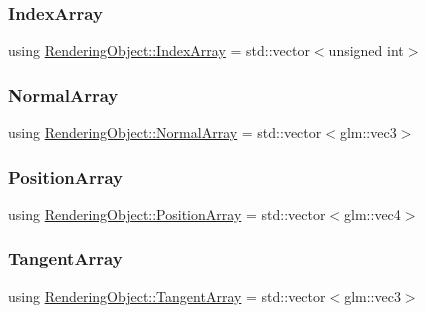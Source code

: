 \hypertarget{class_rendering_object_a9931c88bca3384065c6691dfe1e60af1}{}\label{class_rendering_object_a9931c88bca3384065c6691dfe1e60af1}
\subsubsection{\texorpdfstring{Index\+Array}{IndexArray}}
{\footnotesize\ttfamily using \hyperlink{class_rendering_object_a9931c88bca3384065c6691dfe1e60af1}{Rendering\+Object\+::\+Index\+Array} =  std\+::vector$<$unsigned int$>$}

\hypertarget{class_rendering_object_a327c4d892de8d6138fb59afa6d078257}{}\label{class_rendering_object_a327c4d892de8d6138fb59afa6d078257}
\subsubsection{\texorpdfstring{Normal\+Array}{NormalArray}}
{\footnotesize\ttfamily using \hyperlink{class_rendering_object_a327c4d892de8d6138fb59afa6d078257}{Rendering\+Object\+::\+Normal\+Array} =  std\+::vector$<$glm\+::vec3$>$}

\hypertarget{class_rendering_object_a1223b9cf03f2029b9c43d71042c2a18e}{}\label{class_rendering_object_a1223b9cf03f2029b9c43d71042c2a18e}
\subsubsection{\texorpdfstring{Position\+Array}{PositionArray}}
{\footnotesize\ttfamily using \hyperlink{class_rendering_object_a1223b9cf03f2029b9c43d71042c2a18e}{Rendering\+Object\+::\+Position\+Array} =  std\+::vector$<$glm\+::vec4$>$}

\hypertarget{class_rendering_object_a45b53e911c2f0131aa10e89869d38944}{}\label{class_rendering_object_a45b53e911c2f0131aa10e89869d38944}
\subsubsection{\texorpdfstring{Tangent\+Array}{TangentArray}}
{\footnotesize\ttfamily using \hyperlink{class_rendering_object_a45b53e911c2f0131aa10e89869d38944}{Rendering\+Object\+::\+Tangent\+Array} =  std\+::vector$<$glm\+::vec3$>$}

